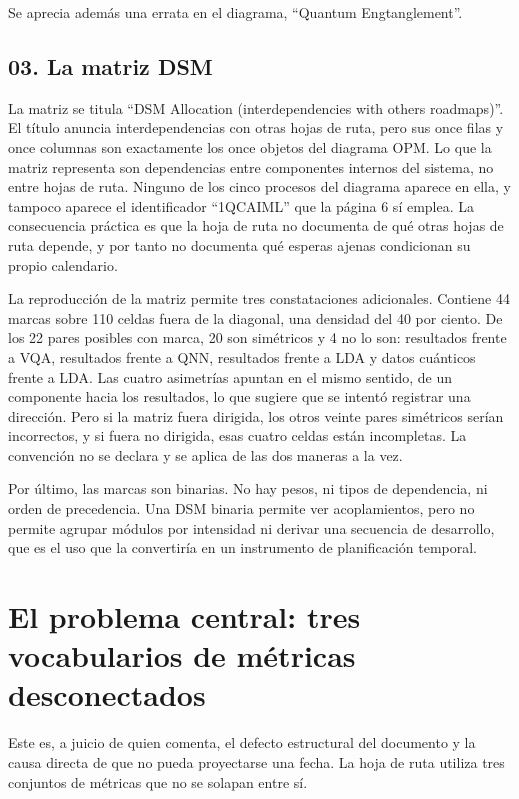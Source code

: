 \documentclass[11pt,letterpaper]{article}
\begin{document}
Se aprecia además una errata en el diagrama, \enquote{Quantum Engtanglement}.

\subsection*{03. La matriz DSM}

La matriz se titula \enquote{DSM Allocation (interdependencies with others
roadmaps)}. El título anuncia interdependencias con otras hojas de ruta, pero
sus once filas y once columnas son exactamente los once objetos del diagrama
OPM. Lo que la matriz representa son dependencias entre componentes internos
del sistema, no entre hojas de ruta. Ninguno de los cinco procesos del
diagrama aparece en ella, y tampoco aparece el identificador \enquote{1QCAIML}
que la página 6 sí emplea. La consecuencia práctica es que la hoja de ruta no
documenta de qué otras hojas de ruta depende, y por tanto no documenta qué
esperas ajenas condicionan su propio calendario.

La reproducción de la matriz permite tres constataciones adicionales. Contiene
44 marcas sobre 110 celdas fuera de la diagonal, una densidad del 40 por
ciento. De los 22 pares posibles con marca, 20 son simétricos y 4 no lo son:
resultados frente a VQA, resultados frente a QNN, resultados frente a LDA y
datos cuánticos frente a LDA. Las cuatro asimetrías apuntan en el mismo
sentido, de un componente hacia los resultados, lo que sugiere que se intentó
registrar una dirección. Pero si la matriz fuera dirigida, los otros veinte
pares simétricos serían incorrectos, y si fuera no dirigida, esas cuatro
celdas están incompletas. La convención no se declara y se aplica de las dos
maneras a la vez.

Por último, las marcas son binarias. No hay pesos, ni tipos de dependencia, ni
orden de precedencia. Una DSM binaria permite ver acoplamientos, pero no
permite agrupar módulos por intensidad ni derivar una secuencia de desarrollo,
que es el uso que la convertiría en un instrumento de planificación temporal.

\section{El problema central: tres vocabularios de métricas desconectados}

Este es, a juicio de quien comenta, el defecto estructural del documento y la
causa directa de que no pueda proyectarse una fecha. La hoja de ruta utiliza
tres conjuntos de métricas que no se solapan entre sí.
\end{document}
